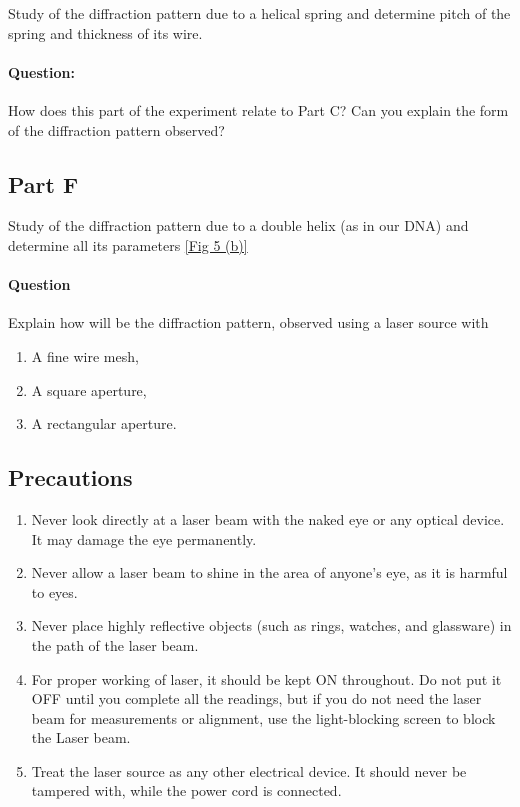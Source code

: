 Study of the diffraction pattern due to a helical spring and determine pitch of the spring and thickness of its wire. 

\paragraph{Question:} How does this part of the experiment relate to Part C? Can you explain the form of the diffraction pattern observed?

\subsection*{Part F}

Study of the diffraction pattern due to a double helix (as in our DNA) and determine all its parameters \ref{Fig 5 (b)}


\paragraph{Question} Explain how will be the diffraction pattern, observed using a laser source with
\begin{enumerate}[label=(\alph*)]
    \itemsep0em
    \item A fine wire mesh,
    \item A square aperture,
    \item A rectangular aperture.
\end{enumerate}




\subsection*{Precautions}

\begin{enumerate}
    \item Never look directly at a laser beam with the naked eye or any optical device. It may damage the eye permanently.
    \item Never allow a laser beam to shine in the area of anyone’s eye, as it is harmful to eyes.
    \item Never place highly reflective objects (such as rings, watches, and glassware) in the path of the laser beam.
    \item For proper working of laser, it should be kept ON throughout. Do not put it OFF until you complete all the readings, but if you do not need the laser beam for measurements or alignment, use the light-blocking screen to block the Laser beam.
    \item Treat the laser source as any other electrical device. It should never be tampered with, while the power cord is connected.
    
\end{enumerate}



